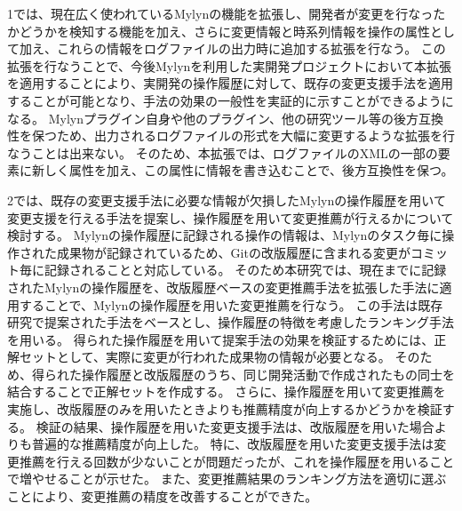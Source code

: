 \documentclass[a4paper]{jsbook}
\begin{document}
1では、現在広く使われているMylynの機能を拡張し、開発者が変更を行なったかどうかを検知する機能を加え、さらに変更情報と時系列情報を操作の属性として加え、これらの情報をログファイルの出力時に追加する拡張を行なう。
この拡張を行なうことで、今後Mylynを利用した実開発プロジェクトにおいて本拡張を適用することにより、実開発の操作履歴に対して、既存の変更支援手法を適用することが可能となり、手法の効果の一般性を実証的に示すことができるようになる。
Mylynプラグイン自身や他のプラグイン、他の研究ツール等の後方互換性を保つため、出力されるログファイルの形式を大幅に変更するような拡張を行なうことは出来ない。
そのため、本拡張では、ログファイルのXMLの一部の要素に新しく属性を加え、この属性に情報を書き込むことで、後方互換性を保つ。

2では、既存の変更支援手法に必要な情報が欠損したMylynの操作履歴を用いて変更支援を行える手法を提案し、操作履歴を用いて変更推薦が行えるかについて検討する。
Mylynの操作履歴に記録される操作の情報は、Mylynのタスク毎に操作された成果物が記録されているため、Gitの改版履歴に含まれる変更がコミット毎に記録されることと対応している。
そのため本研究では、現在までに記録されたMylynの操作履歴を、改版履歴ベースの変更推薦手法を拡張した手法に適用することで、Mylynの操作履歴を用いた変更推薦を行なう。
この手法は既存研究で提案された手法をベースとし、操作履歴の特徴を考慮したランキング手法を用いる。
得られた操作履歴を用いて提案手法の効果を検証するためには、正解セットとして、実際に変更が行われた成果物の情報が必要となる。
そのため、得られた操作履歴と改版履歴のうち、同じ開発活動で作成されたもの同士を結合することで正解セットを作成する。
さらに、操作履歴を用いて変更推薦を実施し、改版履歴のみを用いたときよりも推薦精度が向上するかどうかを検証する。
検証の結果、操作履歴を用いた変更支援手法は、改版履歴を用いた場合よりも普遍的な推薦精度が向上した。
特に、改版履歴を用いた変更支援手法は変更推薦を行える回数が少ないことが問題だったが、これを操作履歴を用いることで増やせることが示せた。
また、変更推薦結果のランキング方法を適切に選ぶことにより、変更推薦の精度を改善することができた。
\end{document}
